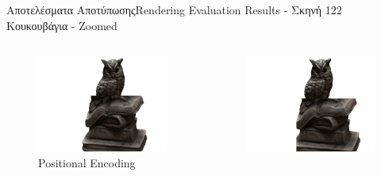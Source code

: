 \documentclass[10pt]{beamer}
\begin{document}
\begin{frame}{Αποτελέσματα Αποτύπωσης}{Rendering Evaluation Results - Σκηνή 122 Κουκουβάγια - Zoomed}
    \begin{columns}[T]
            \begin{figure}
                \includegraphics[height=.3\textheight, width=\linewidth, keepaspectratio]{images/chapter5_img/RenderingResults/PositionalEncoding/eval_055_zoomed.jpg}
                \caption{\tiny{Positional Encoding}}
            \end{figure}
            \begin{figure}
                \includegraphics[height=.3\textheight, width=\linewidth, keepaspectratio]{images/chapter5_img/RenderingResults/FourierNTK/eval_055_zoomed.jpg}

\end{figure}
\end{columns}
\end{frame}
\end{document}
